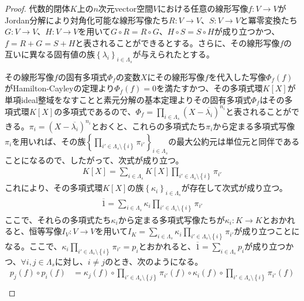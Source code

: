 \documentclass[dvipdfmx]{jsarticle}
\begin{document}
\begin{proof}
代数的閉体$K$上の$n$次元vector空間$V$における任意の線形写像$f:V \rightarrow V$がJordan分解により対角化可能な線形写像たち$R:V \rightarrow V$、$S:V \rightarrow V$と冪零変換たち$G:V \rightarrow V$、$H:V \rightarrow V$を用いて$G \circ R = R \circ G$、$H \circ S = S \circ H$が成り立つかつ、$f = R + G = S + H$と表されることができるとする。さらに、その線形写像$f$の互いに異なる固有値の族$\left\{ \lambda_{i} \right\}_{i \in \varLambda_{s}}$が与えられたとする。\par
その線形写像$f$の固有多項式$\varPhi_{f}$の変数$X$にその線形写像$f$を代入した写像$\varPhi_{f}(f)$がHamilton-Cayleyの定理より$\varPhi_{f}(f) = 0$を満たすかつ、その多項式環$K[X]$が単項ideal整域をなすことと素元分解の基本定理よりその固有多項式$\varPhi_{f}$はその多項式環$K[X]$の多項式であるので、$\varPhi_{f} = \prod_{i \in \varLambda_{s}} \left( X - \overline{\lambda_{i}} \right)^{n_{i}}$と表されることができる。$\pi_{i} = \left( X - \overline{\lambda_{i}} \right)^{n_{i}}$とおくと、これらの多項式たち$\pi_{i}$から定まる多項式写像$\pi_{i}$を用いれば、その族$\left\{ \prod_{i' \in \varLambda_{s} \setminus \left\{ i \right\}} {\pi_{i'}} \right\}_{i \in \varLambda_{s}}$の最大公約元は単位元と同伴であることになるので、したがって、次式が成り立つ。
\begin{align*}
K[X] = \sum_{i \in \varLambda_{s}} {K[X]\prod_{i' \in \varLambda_{s} \setminus \left\{ i \right\}} {\pi_{i'}}}
\end{align*}
これにより、その多項式環$K[X]$の族$\left\{ \kappa_{i} \right\}_{i \in \varLambda_{s}}$が存在して次式が成り立つ。
\begin{align*}
\overline{1} = \sum_{i \in \varLambda_{s}} {\kappa_{i}\prod_{i' \in \varLambda_{s} \setminus \left\{ i \right\}} {\pi_{i'}}}
\end{align*}
ここで、それらの多項式たち$\kappa_{i}$から定まる多項式写像たちが$\kappa_{i}:K \rightarrow K$とおかれると、恒等写像$I_{V}:V \rightarrow V$を用いて$I_{K} = \sum_{i \in \varLambda_{s}} {\kappa_{i}\prod_{i' \in \varLambda_{s} \setminus \left\{ i \right\}} \pi_{i'}}$が成り立つことになる。ここで、$\kappa_{i}\prod_{i' \in \varLambda_{s} \setminus \left\{ i \right\}} {\pi_{i'}} = p_{i}$とおかれると、$\overline{1} = \sum_{i \in \varLambda_{s}} {p_{i}}$が成り立つかつ、$\forall i,j \in \varLambda_{s}$に対し、$i \neq j$のとき、次のようになる。
\begin{align*}
p_{j}(f) \circ p_{i}(f) &= \kappa_{j}(f) \circ \prod_{i' \in \varLambda_{s} \setminus \left\{ j \right\}} {\pi_{i'}(f)} \circ \kappa_{i}(f) \circ \prod_{i' \in \varLambda_{s} \setminus \left\{ i \right\}} {\pi_{i'}(f)} \\

\end{align*}
\end{proof}
\end{document}

